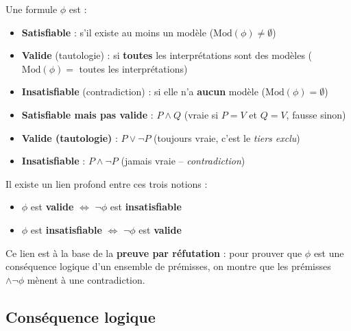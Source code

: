 \documentclass[11pt,a4paper]{article}
\begin{document}
\begin{definitionbox}
Une formule $\phi$ est :
\begin{itemize}[nosep]
    \item \textbf{Satisfiable} : s'il existe au moins un modèle ($\text{Mod}(\phi) \neq \emptyset$)
    \item \textbf{Valide} (tautologie) : si \textbf{toutes} les interprétations sont des modèles ($\text{Mod}(\phi) = $ toutes les interprétations)
    \item \textbf{Insatisfiable} (contradiction) : si elle n'a \textbf{aucun} modèle ($\text{Mod}(\phi) = \emptyset$)
\end{itemize}
\end{definitionbox}

\begin{exemplebox}
\begin{itemize}[nosep]
    \item \textbf{Satisfiable mais pas valide} : $P \land Q$ (vraie si $P=V$ et $Q=V$, fausse sinon)
    \item \textbf{Valide (tautologie)} : $P \lor \neg P$ (toujours vraie, c'est le \textit{tiers exclu})
    \item \textbf{Insatisfiable} : $P \land \neg P$ (jamais vraie -- \textit{contradiction})
\end{itemize}
\end{exemplebox}

\begin{retenirbox}
Il existe un lien profond entre ces trois notions :
\begin{itemize}[nosep]
    \item $\phi$ est \textbf{valide} $\iff$ $\neg\phi$ est \textbf{insatisfiable}
    \item $\phi$ est \textbf{insatisfiable} $\iff$ $\neg\phi$ est \textbf{valide}
\end{itemize}
Ce lien est à la base de la \textbf{preuve par réfutation} : pour prouver que $\phi$ est une conséquence logique d'un ensemble de prémisses, on montre que les prémisses $\land \neg\phi$ mènent à une contradiction.
\end{retenirbox}

\subsection{Conséquence logique}
\end{document}
